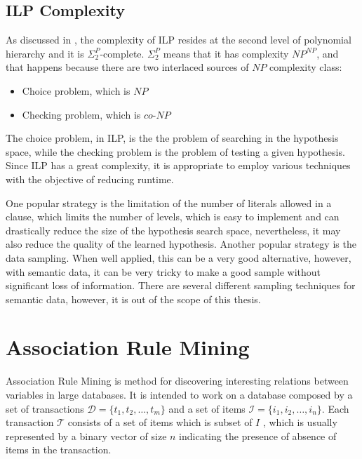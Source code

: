 \subsection{ILP Complexity}

As discussed in \cite{DBLP:journals/ngc/GottlobLS99}, the complexity of ILP resides at the second level of polynomial
hierarchy and it is $\Sigma_2^P$-complete. $\Sigma_2^P$ means that it has complexity $NP^{NP}$, and that happens
because there are two interlaced sources of $NP$ complexity class:
\begin{itemize}
 \item Choice problem, which is $NP$
 \item Checking problem, which is $co$-$NP$
\end{itemize}

The choice problem, in ILP, is the the problem of searching in the hypothesis space, while the checking problem is the
problem of testing a given hypothesis. Since ILP has a great complexity, it is appropriate to employ various techniques
with the objective of reducing runtime.

One popular strategy is the limitation of the number of literals allowed in a clause, which limits the number of
levels, which is easy to implement and can drastically reduce the size of the hypothesis search space, nevertheless, it
may also reduce the quality of the learned hypothesis. Another popular strategy is the data sampling. When well applied,
this can be a very good alternative, however, with semantic data, it can be very tricky to make a good sample without
significant loss of information. There are several different sampling techniques for semantic data, however, it is out
of the scope of this thesis.


\section{Association Rule Mining}
\label{sec:rw-arm}
\cite{Agrawal:1993:MAR:170036.170072}
\cite{Hipp00algorithmsfor}

Association Rule Mining is method for discovering interesting relations between variables in large databases. It is
intended to work on a database composed by a set of transactions $\mathcal{D}=\{t_1,t_2,\ldots,t_m\}$ and a set of
items
$\mathcal{I}=\{i_1,i_2,\ldots,i_n\}$. Each transaction $\mathcal{T}$ consists of a set of items which is subset of $I$
,
which is usually represented by a binary vector of size $n$ indicating the presence of absence of items in the
transaction.

